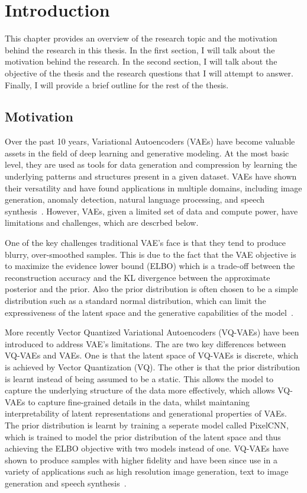 \chapter{Introduction}

This chapter provides an overview of the research topic and the motivation behind the research in this thesis. In the first section, I will talk about the motivation behind the research. In the second section, I will talk about the objective of the thesis and the research questions that I will attempt to answer. Finally, I will provide a brief outline for the rest of the thesis.

\section{Motivation}

Over the past 10 years, Variational Autoencoders (VAEs) have become valuable assets in the field of deep learning and generative modeling. At the most basic level, they are used as tools for data generation and compression by learning the underlying patterns and structures present in a given dataset. VAEs have shown their versatility and have found applications in multiple domains, including image generation, anomaly detection, natural language processing, and speech synthesis~\cite{kingma2013autoencoding,Kingma_2019, vqvae, dalle}. However, VAEs, given a limited set of data and compute power, have limitations and challenges, which are descrbed below.

One of the key challenges traditional VAE's face is that they tend to produce blurry, over-smoothed samples. This is due to the fact that the VAE objective is to maximize the evidence lower bound (ELBO) which is a trade-off between the reconstruction accuracy and the KL divergence between the approximate posterior and the prior. Also the prior distribution is often chosen to be a simple distribution such as a standard normal distribution, which can limit the expressiveness of the latent space and the generative capabilities of the model~\cite{Kingma_2019}.

More recently Vector Quantized Variational Autoencoders (VQ-VAEs) have been introduced to address VAE's limitations. The are two key differences between VQ-VAEs and VAEs. One is that the latent space of VQ-VAEs is discrete, which is achieved by Vector Quantization (VQ). The other is that the prior distribution is learnt instead of being assumed to be a static. This allows the model to capture the underlying structure of the data more effectively, which allows VQ-VAEs to capture fine-grained details in the data, whilst maintaning interpretability of latent representations and generational properties of VAEs. The prior distribution is learnt by training a seperate model called PixelCNN, which is trained to model the prior distribution of the latent space and thus achieving the ELBO objective with two models instead of one. VQ-VAEs have shown to produce samples with higher fidelity and have been since use in a variety of applications such as high resolution image generation, text to image generation and speech synthesis~\cite{vqvae,vqvae2, dalle}.

